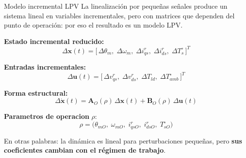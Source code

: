 \documentclass[aspectratio=169,t]{beamer}
\begin{document}
\begin{frame}{Modelo incremental LPV}
{\small\color{uncGray}La linealización por pequeñas señales produce un sistema lineal en variables incrementales, pero con matrices que dependen del punto de operación: por eso el resultado es un modelo LPV.}\par
\vspace{3mm}

\textbf{Estado incremental reducido:}
\begin{equation*}
\Delta\bm{x}(t)=
\big[\,\Delta\theta_m,\;\Delta\omega_m,\;\Delta i_{qs}^{r},\;\Delta i_{ds}^{r},\;\Delta T_s^\circ\,\big]^T
\end{equation*}

\textbf{Entradas incrementales:}
\begin{equation*}
\Delta\bm{u}(t)=
\big[\,\Delta v_{qs}^{r},\;\Delta v_{ds}^{r},\;\Delta T_{ld},\;\Delta T_{amb}^\circ\,\big]^T
\end{equation*}

\textbf{Forma estructural:}
\begin{equation*}
\Delta\dot{\bm{x}}(t)=\bm{A}_O(\rho)\,\Delta\bm{x}(t)+\bm{B}_O(\rho)\,\Delta\bm{u}(t)
\end{equation*}

\textbf{Parametros de operacion} $\rho$:
\begin{equation*}
\rho=\big(\theta_{mO},\;\omega_{mO},\;i_{qsO}^{r},\;i_{dsO}^{r},\;T_{sO}^\circ\big)
\end{equation*}

{\small En otras palabras: la dinámica es lineal para perturbaciones pequeñas, pero \textbf{sus coeficientes cambian con el régimen de trabajo}.}
\end{frame}
\end{document}
